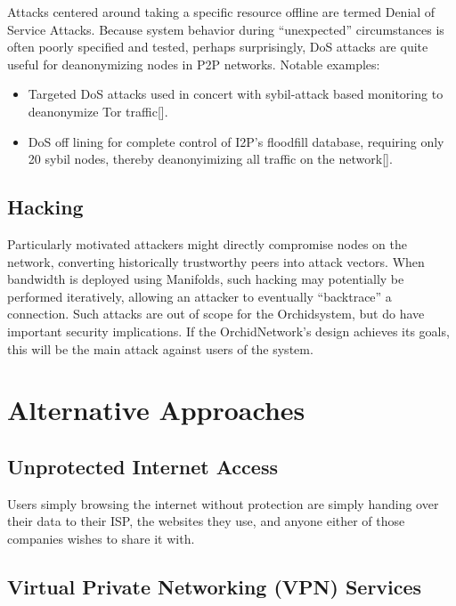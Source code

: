 \documentclass{article}
\newcommand{\orchid}{Orchid}
\newcommand{\Orchid}{\orchid}
\begin{document}
Attacks centered around taking a specific resource offline are termed Denial of Service Attacks. Because system behavior during “unexpected” circumstances is often poorly specified and tested, perhaps surprisingly, DoS attacks are quite useful for deanonymizing nodes in P2P networks. Notable examples:

\begin{itemize}
\item Targeted DoS attacks used in concert with sybil-attack based monitoring to deanonymize Tor traffic[].
\item DoS off lining for complete control of I2P’s floodfill database, requiring only 20 sybil nodes, thereby deanonyimizing all traffic on the network[].
\end{itemize}

\subsection{Hacking}

Particularly motivated attackers might directly compromise nodes on the network, converting historically trustworthy peers into attack vectors. When bandwidth is deployed using Manifolds, such hacking may potentially be performed iteratively, allowing an attacker to eventually ``backtrace'' a connection. Such attacks are out of scope for the \Orchid system, but do have important security implications. If the \Orchid Network's design achieves its goals, this will be the main attack against users of the system.


\section{Alternative Approaches}
\label{sec:prior-work}

\subsection{Unprotected Internet Access}

Users simply browsing the internet without protection are simply
handing over their data to their ISP, the websites they use, and
anyone either of those companies wishes to share it with.

\subsection{Virtual Private Networking (VPN) Services}
\end{document}
